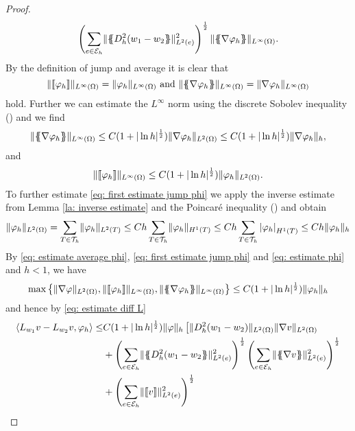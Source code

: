 \begin{proof}
\begin{align}
				\left(\sum_{e \in \edges} \LTwonormE{\average{\hess{(w_1-w_2}}}^2 \right)^{\frac 1 2} 
				\LInftynorm{\average{\nabla \varphi_h}}. \label{eq: estimate diff L}
	\end{align}
	By the definition of jump and average it is clear that 
	\[
		\lVert \llbracket \varphi_h \rrbracket \rVert_{L^\infty(\Omega)} = \lVert \varphi_h \rVert_{L^\infty(\Omega)}\text{ and }\lVert \{\!\!\{ \nabla \varphi_h \}\!\!\} \rVert_{L^\infty(\Omega)}= \lVert \nabla \varphi_h \rVert_{L^\infty(\Omega)}
	\]
	hold. Further we can estimate the $L^\infty$ norm using the discrete Sobolev inequality () and we find
	\begin{align}
		\lVert \{\!\!\{ \nabla \varphi_h \}\!\!\} \rVert_{L^\infty(\Omega)} \leq C (1+|\ln h|^{\frac 1 2}) \lVert \nabla \varphi_h \rVert_{L^2(\Omega)} \leq C (1+|\ln h|^{\frac 1 2}) \lVert \nabla \varphi_h \rVert_{h}, \label{eq: estimate average phi}
	\end{align}
	and
	\begin{align}
		\lVert \llbracket \varphi_h \rrbracket \rVert_{L^\infty(\Omega)} \leq C (1+|\ln h|^{\frac 1 2}) \lVert \varphi_h \rVert_{L^2(\Omega)}. \label{eq: first estimate jump phi}
	\end{align}
	To further estimate \eqref{eq: first estimate jump phi} we apply the inverse estimate from Lemma \ref{la: inverse estimate} and the Poincar\'e inequality () and obtain
	\begin{align}
		\lVert \varphi_h \rVert_{L^2(\Omega)} = \sum_{T \in \mathcal{T}_h} \lVert \varphi_h \rVert_{L^2(T)} \leq C h \sum_{T \in \mathcal{T}_h} \lVert \varphi_h \rVert_{H^1(T)} \leq C h \sum_{T \in \mathcal{T}_h} \left| \varphi_h \right|_{H^1(T)} \leq Ch \lVert \varphi_h \rVert_{h} \label{eq: estimate phi}
	\end{align}
	By \eqref{eq: estimate average phi}, \eqref{eq: first estimate jump phi} and \eqref{eq: estimate phi} and $h<1$, we have
	\begin{align}
		\operatorname{max} \left\{ \lVert \nabla \varphi \rVert_{L^2(\Omega)}, \lVert \llbracket \varphi_h \rrbracket \rVert_{L^\infty(\Omega)}, \lVert \{\!\!\{ \nabla \varphi_h \}\!\!\} \rVert_{L^\infty(\Omega)} \right\}  \leq C (1+|\ln h|^{\frac 1 2}) \lVert \varphi_h \rVert_{h}
	\end{align} 
	and hence by \eqref{eq: estimate diff L}
	\begin{align}
		\bilin{L_{w_1}v- L_{w_2} v} {\varphi_h} 
		\leq& C (1+|\ln h|^{\frac 1 2})\eNorm{\varphi} 
			\left[ 
				\LTwonorm{\hess{(w_1 -w_2)}} \LTwonorm {\nabla v} \nonumber \right.\\
				&+ 	\left(\sum_{e \in \edges} \LTwonormE{\average{\hess{(w_1-w_2}}}^2 \right)^{\frac 1 2} 
					\left(\sum_{e \in \edges} \LTwonormE{\average{\nabla v}}^2 \right)^{\frac 1 2} \nonumber \\
				&+ 	\left(\sum_{e \in \edges} \LTwonormE{\jump v}^2 \right)^{\frac 1 2} 

\end{align}
\end{proof}
